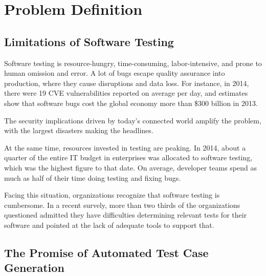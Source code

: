 \iffalse
\section{Problem Definition}

\subsection{Limitations of Software Testing}


Software testing is resource-hungry, time-consuming, labor-intensive, and prone to human omission and error.  A lot of bugs escape quality assurance into production, where they cause disruptions and data loss. For instance, in 2014, there were 19 CVE vulnerabilities reported on average per day, and estimates show that software bugs cost the global economy more than \$300 billion in 2013.

The security implications driven by today's connected world amplify the problem, with the largest disasters making the headlines.

At the same time, resources invested in testing are peaking. In 2014, about a quarter of the entire IT budget in enterprises was allocated to software testing, which was the highest figure to that date.  On average, developer teams spend as much as half of their time doing testing and fixing bugs.

Facing this situation, organizations recognize that software testing is cumbersome.  In a recent survely, more than two thirds of the organizations questioned admitted they have difficulties determining relevant tests for their software and pointed at the lack of adequate tools to support that.

\subsection{The Promise of Automated Test Case Generation}


